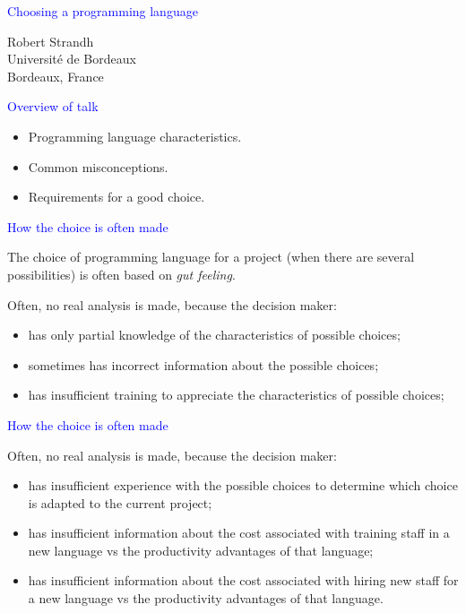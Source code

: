 \documentclass{slides}
\newcommand{\ti}[1]{\begin{center}\Large{\textcolor{blue}{#1}}\end{center}}
\begin{document}
\landscape
\setlength{\oddsidemargin}{1cm}
\setlength{\evensidemargin}{1cm}
\setlength{\marginparwidth}{1cm}
\setlength{\parskip}{0.5cm}
\setlength{\parindent}{0cm}
\begin{slide}\ti{Choosing a programming language}
\vskip 0.5cm
\begin{center}
Robert Strandh \\
Université de Bordeaux \\
Bordeaux, France
\end{center}
\vfill\end{slide}
\begin{slide}\ti{Overview of talk}

  \begin{itemize}
  \item Programming language characteristics.
  \item Common misconceptions.
  \item Requirements for a good choice.
  \end{itemize}

\vfill\end{slide}
\begin{slide}\ti{How the choice is often made}

The choice of programming language for a project (when there are
several possibilities) is often based on \emph{gut feeling}.

Often, no real analysis is made, because the decision maker:

\begin{itemize}
\item has only partial knowledge of the characteristics of possible
  choices;
\item sometimes has incorrect information about the possible choices;
\item has insufficient training to appreciate the characteristics of
  possible choices;
\end{itemize}

\vfill\end{slide}
\begin{slide}\ti{How the choice is often made}

Often, no real analysis is made, because the decision maker:

\begin{itemize}
\item has insufficient experience with the possible choices to
  determine which choice is adapted to the current project;
\item has insufficient information about the cost associated with
  training staff in a new language vs the productivity advantages of
  that language;
\item has insufficient information about the cost associated with
  hiring new staff for a new language vs the productivity advantages of
  that language.
\end{itemize}

\vfill\end{slide}
\end{document}

